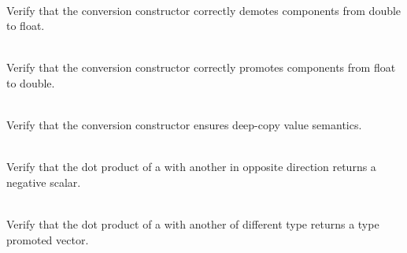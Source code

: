 \begin{DoxyRefList}
\item[{\parbox[t]{\linewidth}{Member \doxylink{_type_conversion_tests_8cpp_a0e0c185d92eb53264b7c9d6f8c087879}{Vector4\+DConversion\+Constructor\+\_\+\+Demotes\+Type} ()}}]\hfill \\
\label{test__test000151}%
%
Verify that the  conversion constructor correctly demotes components from double to float.  
\item[{\parbox[t]{\linewidth}{Member \doxylink{_type_conversion_tests_8cpp_aa7a59762098ebf3aea4f06c9cfa6dbf4}{Vector4\+DConversion\+Constructor\+\_\+\+Promotes\+Type} ()}}]\hfill \\
\label{test__test000149}%
%
Verify that the  conversion constructor correctly promotes components from float to double.  
\item[{\parbox[t]{\linewidth}{Member \doxylink{_type_conversion_tests_8cpp_a5a7fa4ed84cfa76e811ccd87f44749ad}{Vector4\+DConversion\+Constructor\+\_\+\+Returns\+New\+Instance} ()}}]\hfill \\
\label{test__test000150}%
%
Verify that the  conversion constructor ensures deep-\/copy value semantics.  
\item[{\parbox[t]{\linewidth}{Member \doxylink{_product_tests_8cpp_a4ce7ca6be0e057f649edb97cc08fd82c}{Vector4\+DDot\+Product\+\_\+\+Anti\+Parallel\+Dot\+Product\+Returns\+Negative\+Scalar} ()}}]\hfill \\
\label{test__test000123}%
%
Verify that the dot product of a  with another  in opposite direction returns a negative scalar.  
\item[{\parbox[t]{\linewidth}{Member \doxylink{_product_tests_8cpp_a26e51f21b6148a59ce7e29928ed19309}{Vector4\+DDot\+Product\+\_\+\+Mixed\+Type\+Dot\+Product\+Promotes\+Type} ()}}]\hfill \\
\label{test__test000124}%
%
Verify that the dot product of a  with another  of different type returns a type promoted vector.  
\item[{\parbox[t]{\linewidth}{Member \doxylink{_product_tests_8cpp_aa436dd759231daf72a9de66f38b55581}{Vector4\+DDot\+Product\+\_\+\+Non\+Orthogonal\+Dot\+Product\+Returns\+Non\+Zero\+Scalar} ()}}]\hfill \\

\end{DoxyRefList}
